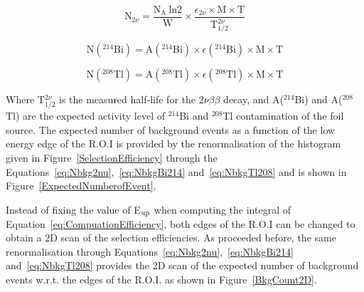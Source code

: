 \documentclass[main.tex]{subfiles}
\begin{document}
\begin{equation}\label{eq:Nbkg2nu}
\text{N}_{\text{2}\nu} = \frac{\text{N}_\text{A}~\text{ln2}}{\text{W}} \times \frac{\epsilon_{\text{2}\nu} \times \text{M} \times \text{T}}{\text{T}_{\text{1/2}}^{\text{2}\nu}}
\end{equation}


\begin{equation}\label{eq:NbkgBi214}
\text{N} (^{\text{214}}\text{Bi}) = \text{A} (^{\text{214}}\text{Bi}) \times \epsilon (^{\text{214}}\text{Bi}) \times \text{M} \times \text{T} 
\end{equation}


\begin{equation}\label{eq:NbkgTl208}
\text{N} (^{\text{208}}\text{Tl}) = \text{A} (^{\text{208}}\text{Tl}) \times \epsilon (^{\text{208}}\text{Tl}) \times \text{M} \times \text{T} 
\end{equation}


\NI Where T$_{\text{1/2}}^{\text{2}\nu}$ is the measured half-life for the 2$\nu\beta\beta$ decay, and A($^{\text{214}}$Bi) and A($^{\text{208}}$Tl) are the expected activity level of $^{\text{214}}$Bi and $^{\text{208}}$Tl contamination of the foil source. The expected number of background events as a function of the low energy edge of the R.O.I is provided by the renormalisation of the histogram given in Figure~\ref{SelectionEfficiency} through the Equations~\ref{eq:Nbkg2nu},~\ref{eq:NbkgBi214} and~\ref{eq:NbkgTl208} and is shown in Figure~\ref{ExpectedNumberofEvent}.


\bigskip


\NI Instead of fixing the value of E$_\text{\text{up}}$ when computing the integral of Equation~\ref{eq:CompuationEfficiency}, both edges of the R.O.I can be changed to obtain a 2D scan of the selection efficiencies. As proceeded before, the same renormalisation through Equations~\ref{eq:Nbkg2nu},~\ref{eq:NbkgBi214} and~\ref{eq:NbkgTl208} provides the 2D scan of the expected number of background events w.r.t. the edges of the R.O.I. as shown in Figure~\ref{BkgCount2D}.
\end{document}

